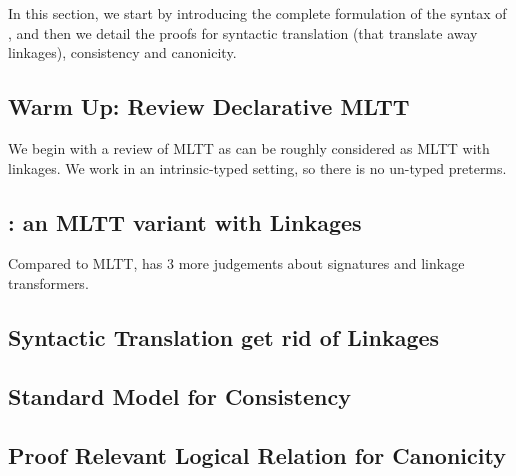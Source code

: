 In this section, we start by introducing the complete formulation of the syntax of \TT, 
and then we detail the proofs for syntactic translation (that translate away linkages), 
consistency and canonicity. 

\subsection{Warm Up: Review Declarative MLTT}
We begin with a review of MLTT as \TT can be roughly considered as MLTT with linkages.
We work in an intrinsic-typed setting, so there is no un-typed preterms.



\subsection{\TT : an MLTT variant with Linkages}
Compared to MLTT, \TT has 3 more judgements about signatures and linkage transformers.








\subsection{Syntactic Translation get rid of Linkages}



\subsection{Standard Model for Consistency}




\subsection{Proof Relevant Logical Relation for Canonicity}

